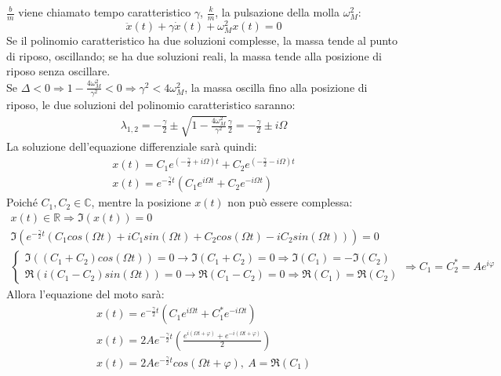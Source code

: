 \documentclass{article}
\numberwithin{equation}{subsection}
\begin{document}
$\displaystyle\frac{b}{m}$ viene chiamato tempo caratteristico 
$\gamma$, $\displaystyle\frac{k}{m}$, 
la pulsazione della molla $\omega_M^{2}$:
\begin{equation}
    \ddot x(t)+\gamma\dot x(t)+\omega_M^{2}x(t)=0
\end{equation}
Se il polinomio caratteristico ha due soluzioni complesse, 
la massa tende al punto di riposo, oscillando; se ha 
due soluzioni reali, la massa tende alla posizione di riposo 
senza oscillare.\\
Se $\Delta < 0\Rightarrow 1-\displaystyle\frac{4\omega_M^{2}}{\gamma^{2}}<0\Rightarrow \gamma^{2} < 4\omega_M^{2}$, 
la massa oscilla fino alla posizione di riposo, le due 
soluzioni del polinomio caratteristico saranno:
\begin{gather}
    \lambda_{1,2}=-\displaystyle\frac{\gamma}{2}\pm\sqrt{1-\displaystyle\frac{4\omega_M^{2}}{\gamma^{2}}}\displaystyle\frac{\gamma}{2}=-\frac{\gamma}{2}\pm i\Omega
\end{gather}
La soluzione dell'equazione differenziale sarà quindi:
\begin{gather}
    \displaystyle x(t)=C_1e^{\left(-\displaystyle\frac{\gamma}{2}+ i\Omega\right)t}+C_2e^{\left(-\displaystyle\frac{\gamma}{2}- i\Omega\right)t}\\
    x(t)=e^{-\displaystyle\frac{\gamma}{2}t}\left(C_1e^{i\Omega t}+C_2e^{-i\Omega t}\right)
\end{gather}
Poiché $C_1,C_2\in\mathbb{C}$, mentre la posizione $x(t)$ non 
può essere complessa:
\begin{gather}
    x(t)\in\mathbb{R}\Rightarrow \Im(x(t))=0\\
    \Im\left(e^{-\displaystyle\frac{\gamma}{2}t}(C_1cos(\Omega t)+iC_1sin(\Omega t)+C_2cos(\Omega t)-iC_2sin(\Omega t))\right)=0\\
    \begin{cases}
        \Im((C_1+C_2)cos(\Omega t))=0\rightarrow \Im(C_1+C_2)=0\Rightarrow \Im(C_1)=-\Im(C_2)\\
        \Re(i(C_1-C_2)sin(\Omega t))=0\rightarrow \Re(C_1-C_2)=0\Rightarrow \Re(C_1)=\Re(C_2)
    \end{cases}\Rightarrow C_1=C_2^{*}=Ae^{i\varphi}
\end{gather}
Allora l'equazione del moto sarà:
\begin{gather}
    x(t)=e^{-\displaystyle\frac{\gamma}{2}t}(C_1e^{i\Omega t}+C_1^*e^{-i\Omega t})\\
    x(t)=2Ae^{-\displaystyle\frac{\gamma}{2}t}\left(\displaystyle\frac{e^{i(\Omega t+\varphi)}+e^{-i(\Omega t+\varphi)}}{2}\right)\\
    x(t)=2Ae^{-\displaystyle\frac{\gamma}{2}t}cos\left(\Omega t +\varphi\right),\:A=\Re(C_1)    
\end{gather}
\end{document}
